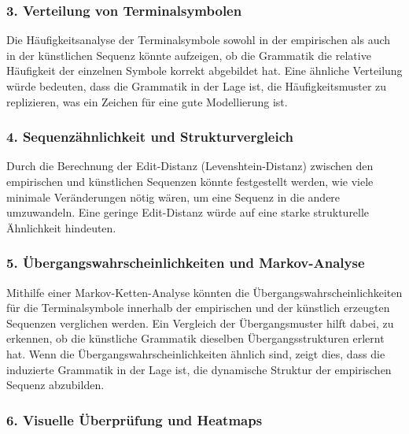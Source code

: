 \documentclass[
]{article}
\begin{document}
\subsubsection{\texorpdfstring{\textbf{3. Verteilung von
Terminalsymbolen}}{3. Verteilung von Terminalsymbolen}}\label{verteilung-von-terminalsymbolen}

Die Häufigkeitsanalyse der Terminalsymbole sowohl in der empirischen als
auch in der künstlichen Sequenz könnte aufzeigen, ob die Grammatik die
relative Häufigkeit der einzelnen Symbole korrekt abgebildet hat. Eine
ähnliche Verteilung würde bedeuten, dass die Grammatik in der Lage ist,
die Häufigkeitsmuster zu replizieren, was ein Zeichen für eine gute
Modellierung ist.

\subsubsection{\texorpdfstring{\textbf{4. Sequenzähnlichkeit und
Strukturvergleich}}{4. Sequenzähnlichkeit und Strukturvergleich}}\label{sequenzuxe4hnlichkeit-und-strukturvergleich}

Durch die Berechnung der Edit-Distanz (Levenshtein-Distanz) zwischen den
empirischen und künstlichen Sequenzen könnte festgestellt werden, wie
viele minimale Veränderungen nötig wären, um eine Sequenz in die andere
umzuwandeln. Eine geringe Edit-Distanz würde auf eine starke
strukturelle Ähnlichkeit hindeuten.

\subsubsection{\texorpdfstring{\textbf{5. Übergangswahrscheinlichkeiten
und
Markov-Analyse}}{5. Übergangswahrscheinlichkeiten und Markov-Analyse}}\label{uxfcbergangswahrscheinlichkeiten-und-markov-analyse}

Mithilfe einer Markov-Ketten-Analyse könnten die
Übergangswahrscheinlichkeiten für die Terminalsymbole innerhalb der
empirischen und der künstlich erzeugten Sequenzen verglichen werden. Ein
Vergleich der Übergangsmuster hilft dabei, zu erkennen, ob die
künstliche Grammatik dieselben Übergangsstrukturen erlernt hat. Wenn die
Übergangswahrscheinlichkeiten ähnlich sind, zeigt dies, dass die
induzierte Grammatik in der Lage ist, die dynamische Struktur der
empirischen Sequenz abzubilden.

\subsubsection{\texorpdfstring{\textbf{6. Visuelle Überprüfung und
Heatmaps}}{6. Visuelle Überprüfung und Heatmaps}}\label{visuelle-uxfcberpruxfcfung-und-heatmaps}
\end{document}
